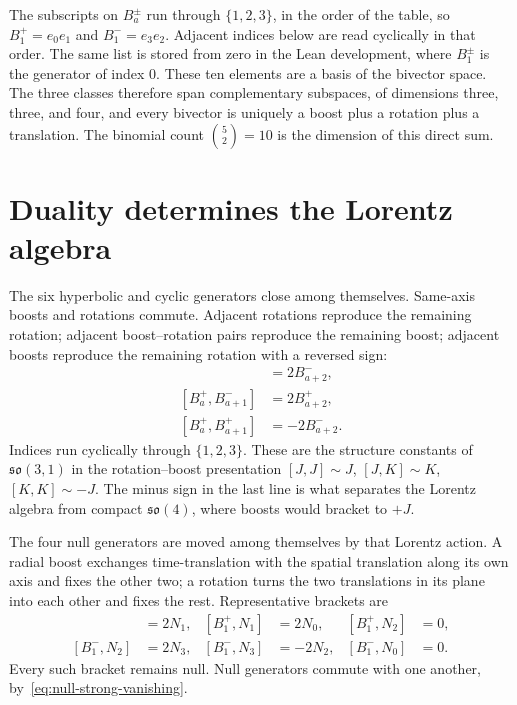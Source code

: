 \documentclass[a4paper]{article}
\begin{document}
The subscripts on \(B_{a}^{\pm}\) run through \(\{1,2,3\}\), in the order of the table, so \(B_{1}^{+}=e_{0}e_{1}\) and \(B_{1}^{-}=e_{3}e_{2}\). Adjacent indices below are read cyclically in that order. The same list is stored from zero in the Lean development, where \(B_{1}^{\pm}\) is the generator of index \(0\). These ten elements are a basis of the bivector space. The three classes therefore span complementary subspaces, of dimensions three, three, and four, and every bivector is uniquely a boost plus a rotation plus a translation. The binomial count \(\binom{5}{2}=10\) is the dimension of this direct sum.

\section{Duality determines the Lorentz algebra}
\label{sec:duality}

The six hyperbolic and cyclic generators close among themselves. Same-axis boosts and rotations commute. Adjacent rotations reproduce the remaining rotation; adjacent boost--rotation pairs reproduce the remaining boost; adjacent boosts reproduce the remaining rotation with a reversed sign:
\begin{align*}
[B^{-}_{a},B^{-}_{a+1}] &= 2B^{-}_{a+2},\\
[B^{+}_{a},B^{-}_{a+1}] &= 2B^{+}_{a+2},\\
[B^{+}_{a},B^{+}_{a+1}] &= -2B^{-}_{a+2}.
\end{align*}
Indices run cyclically through \(\{1,2,3\}\). These are the structure constants of \(\mathfrak{so}(3,1)\) in the rotation--boost presentation \([J,J]\sim J\), \([J,K]\sim K\), \([K,K]\sim -J\). The minus sign in the last line is what separates the Lorentz algebra from compact \(\mathfrak{so}(4)\), where boosts would bracket to \(+J\).

The four null generators are moved among themselves by that Lorentz action. A radial boost exchanges time-translation with the spatial translation along its own axis and fixes the other two; a rotation turns the two translations in its plane into each other and fixes the rest. Representative brackets are
\begin{align*}
[B^{+}_{1},N_{0}]&=2N_{1},&
[B^{+}_{1},N_{1}]&=2N_{0},&
[B^{+}_{1},N_{2}]&=0,\\
[B^{-}_{1},N_{2}]&=2N_{3},&
[B^{-}_{1},N_{3}]&=-2N_{2},&
[B^{-}_{1},N_{0}]&=0.
\end{align*}
Every such bracket remains null. Null generators commute with one another, by~\eqref{eq:null-strong-vanishing}.
\end{document}
